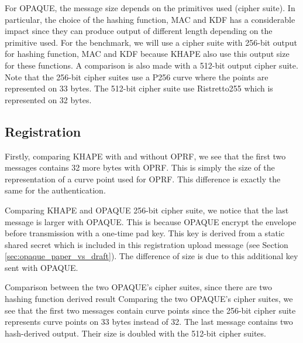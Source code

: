\documentclass[../report.tex]{subfiles}
\begin{document}
For OPAQUE, the message size depends on the primitives used (cipher suite). In particular, the choice of the hashing function, MAC and KDF has a considerable impact since they can produce output of different length depending on the primitive used.
For the benchmark, we will use a cipher suite with 256-bit output for hashing function, MAC and KDF because KHAPE also use this output size for these functions. A comparison is also made with a 512-bit output cipher suite.
Note that the 256-bit cipher suites use a P256 curve where the points are represented on 33 bytes. The 512-bit cipher suite use Ristretto255 which is represented on 32 bytes.

% 
% 


\pgfplotsset{width=\textwidth-2.4cm}


\subsection*{Registration}
Firstly, comparing KHAPE with and without OPRF, we see that the first two messages contains 32 more bytes with OPRF. This is simply the size of the representation of a curve point used for OPRF. This difference is exactly the same for the authentication.

Comparing KHAPE and OPAQUE 256-bit cipher suite, we notice that the last message is larger with OPAQUE.
This is because OPAQUE encrypt the envelope before transmission with a one-time pad key.
This key is derived from a static shared secret which is included in this registration upload message (see Section \ref{sec:opaque_paper_vs_draft}). The difference of size is due to this additional key sent with OPAQUE.

Comparison between the two OPAQUE's cipher suites, since there are two hashing function derived result
Comparing the two OPAQUE's cipher suites, we see that the first two messages contain curve points since the 256-bit cipher suite represents curve points on 33 bytes instead of 32.
The last message contains two hash-derived output. Their size is doubled with the 512-bit cipher suites.
\end{document}
